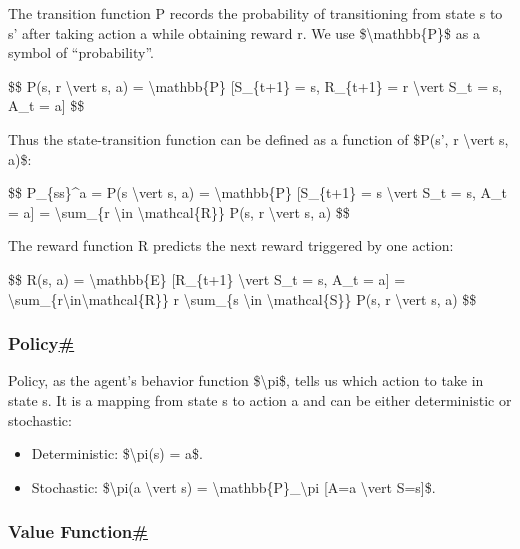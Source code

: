 The transition function P records the probability of transitioning from state s to s' after taking action a while obtaining reward r. We use \$\textbackslash mathbb\{P\}\$ as a symbol of ``probability''.

\$\$ P(s\textquotesingle, r \textbackslash vert s, a) = \textbackslash mathbb\{P\} {[}S\_\{t+1\} = s\textquotesingle, R\_\{t+1\} = r \textbackslash vert S\_t = s, A\_t = a{]} \$\$

Thus the state-transition function can be defined as a function of \$P(s', r \textbackslash vert s, a)\$:

\$\$ P\_\{ss\textquotesingle\}\^{}a = P(s\textquotesingle{} \textbackslash vert s, a) = \textbackslash mathbb\{P\} {[}S\_\{t+1\} = s\textquotesingle{} \textbackslash vert S\_t = s, A\_t = a{]} = \textbackslash sum\_\{r \textbackslash in \textbackslash mathcal\{R\}\} P(s\textquotesingle, r \textbackslash vert s, a) \$\$

The reward function R predicts the next reward triggered by one action:

\$\$ R(s, a) = \textbackslash mathbb\{E\} {[}R\_\{t+1\} \textbackslash vert S\_t = s, A\_t = a{]} = \textbackslash sum\_\{r\textbackslash in\textbackslash mathcal\{R\}\} r \textbackslash sum\_\{s\textquotesingle{} \textbackslash in \textbackslash mathcal\{S\}\} P(s\textquotesingle, r \textbackslash vert s, a) \$\$

\subsubsection{\texorpdfstring{Policy\hyperref[policy]{\#}}{Policy\#}}\label{policy}

Policy, as the agent's behavior function \$\textbackslash pi\$, tells us which action to take in state s. It is a mapping from state s to action a and can be either deterministic or stochastic:

\begin{itemize}
\tightlist
\item
  Deterministic: \$\textbackslash pi(s) = a\$.
\item
  Stochastic: \$\textbackslash pi(a \textbackslash vert s) = \textbackslash mathbb\{P\}\_\textbackslash pi {[}A=a \textbackslash vert S=s{]}\$.
\end{itemize}

\subsubsection{\texorpdfstring{Value Function\hyperref[value-function]{\#}}{Value Function\#}}\label{value-function}

